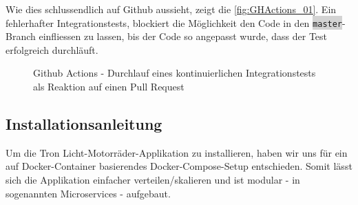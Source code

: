 \documentclass[11pt,ngerman]{article}
\newcommand{\inlinecode}[2]{\colorbox{lightgray}{\lstinline[language=#1]$#2$}}
\begin{document}
    
    \vspace{.5cm}

    \noindent Wie dies schlussendlich auf Github aussieht, zeigt die \autoref{fig:GHActions_01}. Ein fehlerhafter Integrationstests, blockiert die Möglichkeit den Code in den \inlinecode{bash}{master}-Branch einfliessen zu lassen, bis der Code so angepasst wurde, dass der Test erfolgreich durchläuft.
    \begin{figure}[H]
        \centering
        \caption{Github Actions - Durchlauf eines kontinuierlichen Integrationstests als Reaktion auf einen \Gls{Pull Request} }
        \label{fig:GHActions_01}
    \end{figure}

    \subsection{Installationsanleitung}
    Um die Tron Licht-Motorräder-Applikation zu installieren, haben  wir uns für ein auf \Gls{Docker}-Container basierendes \Gls{Docker-Compose}-Setup entschieden. Somit lässt sich die Applikation einfacher verteilen/skalieren und ist modular - in sogenannten \Glspl{Microservice} - aufgebaut.
\end{document}
